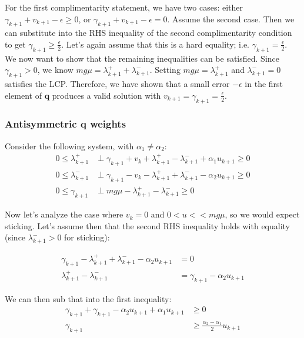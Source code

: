 \documentclass{article}
\renewcommand{\vec}[1]{\boldsymbol{#1}}
\begin{document}
For the first complimentarity statement, we have two cases: either $\gamma_{k+1} + v_{k+1} - \epsilon \geq 0$, or $\gamma_{k+1} + v_{k+1} - \epsilon = 0$. Assume the second case. Then we can substitute into the RHS inequality of the second complimentarity condition to get $\gamma_{k+1} \geq \frac{\epsilon}{2}$. Let's again assume that this is a hard equality; i.e. $\gamma_{k+1} = \frac{\epsilon}{2}$. We now want to show that the remaining inequalities can be satisfied. Since $\gamma_{k+1} > 0$, we know $m g \mu = \lambda^+_{k+1} + \lambda^-_{k+1}$. Setting $m g \mu = \lambda^+_{k+1}$ and $\lambda^-_{k+1} = 0$ satisfies the LCP. Therefore, we have shown that a small error $-\epsilon$ in the first element of $\vec{q}$ produces a valid solution with $v_{k+1} = \gamma_{k+1} = \frac{\epsilon}{2}$. 

\subsubsection{Antisymmetric $\vec{q}$ weights}
Consider the following system, with $\alpha_1 \neq \alpha_2$:
\begin{align*}
    0 \leq \lambda^+_{k+1} &\perp \gamma_{k+1} + v_k + \lambda^+_{k+1} - \lambda^-_{k+1} + \alpha_1 u_{k+1} \geq 0 \\
    0 \leq \lambda^-_{k+1} &\perp \gamma_{k+1} - v_k - \lambda^+_{k+1} + \lambda^-_{k+1} - \alpha_2 u_{k+1} \geq 0 \\
    0 \leq \gamma_{k+1} &\perp m g \mu - \lambda^+_{k+1} - \lambda^-_{k+1} \geq 0
\end{align*}

Now let's analyze the case where $v_k = 0$ and $0 < u << m g \mu$, so we would expect sticking. Let's assume then that the second RHS inequality holds with equality (since $\lambda^-_{k+1} > 0$ for sticking):

\begin{align*}
    \gamma_{k+1} - \lambda^+_{k+1} + \lambda^-_{k+1} - \alpha_2 u_{k+1} &= 0 \\
    \lambda^+_{k+1} - \lambda^-_{k+1} &= \gamma_{k+1} - \alpha_2 u_{k+1}
\end{align*}

We can then sub that into the first inequality:
\begin{align*}
    \gamma_{k+1} + \gamma_{k+1} - \alpha_2 u_{k+1} + \alpha_1 u_{k+1} &\geq 0 \\
    \gamma_{k+1} &\geq \frac{\alpha_2 - \alpha_1}{2} u_{k+1}
\end{align*}
\end{document}
